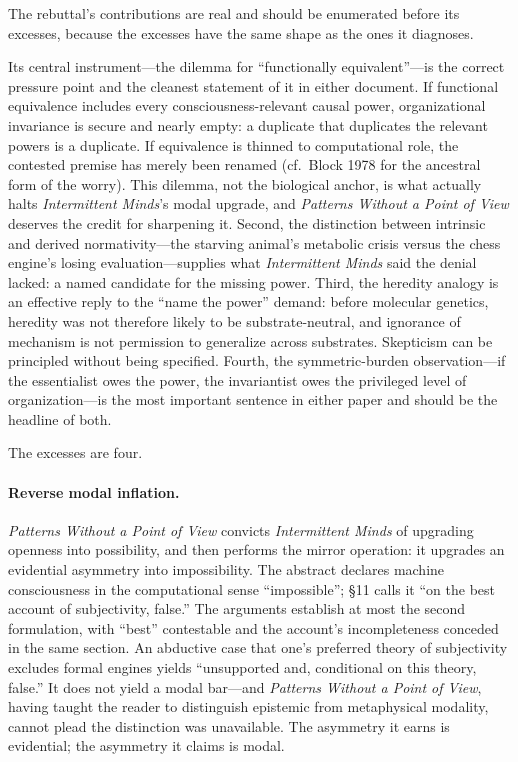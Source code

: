 \documentclass[11pt]{article}
\newcommand{\IM}{\emph{Intermittent Minds}}
\newcommand{\PP}{\emph{Patterns Without a Point of View}}
\begin{document}
The rebuttal's contributions are real and should be enumerated before its excesses, because the excesses have the same shape as the ones it diagnoses.

Its central instrument---the dilemma for ``functionally equivalent''---is the correct pressure point and the cleanest statement of it in either document. If functional equivalence includes every consciousness-relevant causal power, organizational invariance is secure and nearly empty: a duplicate that duplicates the relevant powers is a duplicate. If equivalence is thinned to computational role, the contested premise has merely been renamed (cf.\ Block 1978 for the ancestral form of the worry). This dilemma, not the biological anchor, is what actually halts \IM{}'s modal upgrade, and \PP{} deserves the credit for sharpening it. Second, the distinction between intrinsic and derived normativity---the starving animal's metabolic crisis versus the chess engine's losing evaluation---supplies what \IM{} said the denial lacked: a named candidate for the missing power. Third, the heredity analogy is an effective reply to the ``name the power'' demand: before molecular genetics, heredity was not therefore likely to be substrate-neutral, and ignorance of mechanism is not permission to generalize across substrates. Skepticism can be principled without being specified. Fourth, the symmetric-burden observation---if the essentialist owes the power, the invariantist owes the privileged level of organization---is the most important sentence in either paper and should be the headline of both.

The excesses are four.

\paragraph{Reverse modal inflation.} \PP{} convicts \IM{} of upgrading openness into possibility, and then performs the mirror operation: it upgrades an evidential asymmetry into impossibility. The abstract declares machine consciousness in the computational sense ``impossible''; \S 11 calls it ``on the best account of subjectivity, false.'' The arguments establish at most the second formulation, with ``best'' contestable and the account's incompleteness conceded in the same section. An abductive case that one's preferred theory of subjectivity excludes formal engines yields ``unsupported and, conditional on this theory, false.'' It does not yield a modal bar---and \PP{}, having taught the reader to distinguish epistemic from metaphysical modality, cannot plead the distinction was unavailable. The asymmetry it earns is evidential; the asymmetry it claims is modal.
\end{document}
